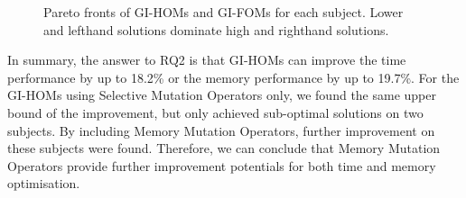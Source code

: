 \documentclass[oribibl]{llncs}
\begin{document}
{\begin{figure}[ht]
	\centering
	\vspace{-1em}
	\caption{Pareto fronts of GI-HOMs and GI-FOMs for each subject. Lower and lefthand solutions dominate high and righthand solutions.}\label{fig_pareto}
\end{figure}

In summary, the answer to RQ2 is that GI-HOMs can improve the time performance by up to 18.2\% or the memory performance by up to 19.7\%. For the GI-HOMs using Selective Mutation Operators only, we found the same upper bound of the improvement, but only achieved sub-optimal solutions on two subjects.
By including Memory Mutation Operators, further improvement on these subjects were found.
Therefore, we can conclude that Memory Mutation Operators provide further improvement potentials for both time and memory optimisation.

}
\end{document}
